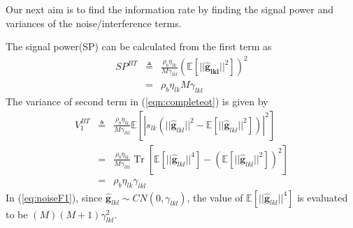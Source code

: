 \documentclass[10pt, a4paper, twoside,fleqn]{article}
\DeclareMathOperator{\Tr}{Tr}
\begin{document}
Our next aim is to find the information rate by finding the signal power and variances of the noise/interference terms. 

The signal power(SP) can be calculated from the first term as
\begin{eqnarray}
	SP^{BT} &\triangleq&  \frac{\rho_b\eta_{lk}}{M\gamma_{lkl}}(\mathbb{E}[||\pmb{\hat g_{lkl}}||^2])^2 \nonumber \\
            &=& \rho_b\eta_{lk}M\gamma_{lkl}
\end{eqnarray}
The variance of second term in (\ref{eqn:completeot}) is given by
\begin{eqnarray}\label{eq:noiseF1}
	V_1^{BT} &\triangleq& \frac{\rho_b \eta_{lk}}{M\gamma_{lkl}}   \mathbb{E}[|s_{lk}\left(||\pmb{\hat g}_{lkl}||^2- \mathbb{E}[||\pmb{\hat  g}_{lkl}||^2] \right)|^2] \nonumber \\
	    &=& \frac{\rho_b \eta_{lk}}{M\gamma_{lkl}}\Tr \left[\mathbb{E}[||\pmb{\hat g}_{lkl}||^4] - (\mathbb{E}[||\pmb{\hat g}_{lkl}||^2])^2 \right] \nonumber  \\
	    &=& \rho_b\eta_{lk}\gamma_{lkl}
\end{eqnarray}
In (\ref{eq:noiseF1}), since $\pmb{\hat g}_{lkl} \sim CN(0,\gamma_{lkl})$, the value of $\mathbb{E}[||\pmb{\hat g}_{lkl}||^4]$ is evaluated to be $(M)(M+1)\gamma_{lkl}^2$.
\end{document}
